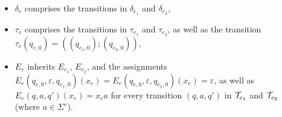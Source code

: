 \begin{itemize}
			\item $\delta_e$ comprises the transitions in $\delta_{e_1}$ and $\delta_{e_2}$,
			\item $\tau_e$ comprises the transitions in $\tau_{e_1}$ and $\tau_{e_2}$, as well as the transition $\tau_e(q_{e,0}) = ((q_{e_1,0}); (q_{e_2,0}))$,
			\item $E_e$ inherits $E_{e_1}$, $E_{e_2}$, and the assignments $E_e(q_{e,0}, \varepsilon, q_{e_1,0})(x_{e}) = E_e(q_{e,0}, \varepsilon, q_{e_2,0})(x_{e}) =\varepsilon$, as well as $E_e(q,a, q')(x_{e}) = x_e a$ for every transition $(q, a, q')$ in $\mathcal{T}_{e_1}$ and $\mathcal{T}_{e_2}$ (where $a \in \Sigma^\varepsilon$).
\end{itemize}
